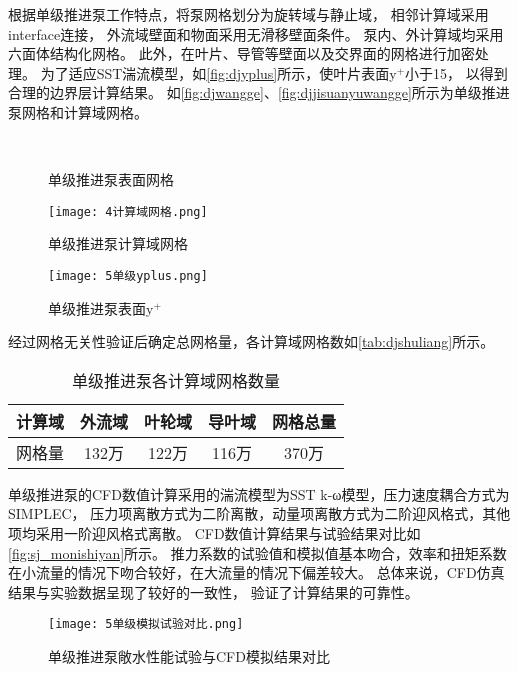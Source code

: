 根据单级推进泵工作特点，将泵网格划分为旋转域与静止域，
相邻计算域采用interface连接，
外流域壁面和物面采用无滑移壁面条件。
泵内、外计算域均采用六面体结构化网格。
此外，在叶片、导管等壁面以及交界面的网格进行加密处理。
为了适应SST湍流模型，如\autoref{fig:djyplus}所示，使叶片表面y$^+$小于15，
以得到合理的边界层计算结果。
如\autoref{fig:djwangge}、\autoref{fig:djjisuanyuwangge}所示为单级推进泵网格和计算域网格。
\begin{figure}[htbp]
    \centering
    \caption{\label{fig:djwangge}单级推进泵表面网格}
\end{figure}
\begin{figure}[htbp]
    \centering
    \texttt{[image: 4计算域网格.png]}
    \caption{\label{fig:djjisuanyuwangge}单级推进泵计算域网格}
\end{figure}
\begin{figure}[htbp]
    \centering
    \texttt{[image: 5单级yplus.png]}
    \caption{\label{fig:djyplus}单级推进泵表面y$^+$}
\end{figure}
经过网格无关性验证后确定总网格量，各计算域网格数如\autoref{tab:djshuliang}所示。
\begin{table}[htbp]
    \centering
    \caption{\label{tab:djshuliang}单级推进泵各计算域网格数量}
    \begin{tabular}{ccccc}
        \toprule
        计算域 & 外流域 & 叶轮域 & 导叶域  & 网格总量 \\
        \midrule
        网格量 & 132万 & 122万 & 116万 & 370万 \\
        \bottomrule
    \end{tabular}
\end{table}

单级推进泵的CFD数值计算采用的湍流模型为SST k-ω模型，压力速度耦合方式为SIMPLEC，
压力项离散方式为二阶离散，动量项离散方式为二阶迎风格式，其他项均采用一阶迎风格式离散\cite{rao2012,bai2020}。
CFD数值计算结果与试验结果对比如\autoref{fig:sj_monishiyan}所示。
推力系数的试验值和模拟值基本吻合，效率和扭矩系数在小流量的情况下吻合较好，在大流量的情况下偏差较大。
总体来说，CFD仿真结果与实验数据呈现了较好的一致性，
验证了计算结果的可靠性。
\begin{figure}[htbp]
    \centering
    \texttt{[image: 5单级模拟试验对比.png]}
    \caption{\label{fig:sj_monishiyan}单级推进泵敞水性能试验与CFD模拟结果对比}
\end{figure}

